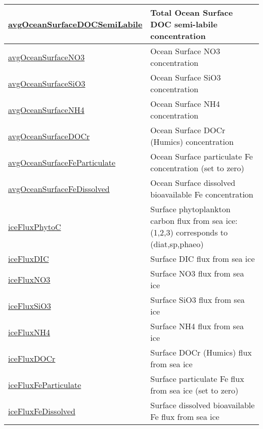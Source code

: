 {\begin{center}
\begin{longtable}{| p{2.0in} | p{4.0in} |}
    \hline
    \hyperref[subsec:var_sec_forcing_avgOceanSurfaceDOCSemiLabile]{avgOceanSurfaceDOCSemiLabile} & Total Ocean Surface DOC semi-labile concentration \\
    \hline
    \hyperref[subsec:var_sec_forcing_avgOceanSurfaceNO3]{avgOceanSurfaceNO3} & Ocean Surface NO3 concentration \\
    \hline
    \hyperref[subsec:var_sec_forcing_avgOceanSurfaceSiO3]{avgOceanSurfaceSiO3} & Ocean Surface SiO3 concentration \\
    \hline
    \hyperref[subsec:var_sec_forcing_avgOceanSurfaceNH4]{avgOceanSurfaceNH4} & Ocean Surface NH4 concentration \\
    \hline
    \hyperref[subsec:var_sec_forcing_avgOceanSurfaceDOCr]{avgOceanSurfaceDOCr} & Ocean Surface DOCr (Humics) concentration \\
    \hline
    \hyperref[subsec:var_sec_forcing_avgOceanSurfaceFeParticulate]{avgOceanSurfaceFeParticulate} & Ocean Surface particulate Fe concentration (set to zero) \\
    \hline
    \hyperref[subsec:var_sec_forcing_avgOceanSurfaceFeDissolved]{avgOceanSurfaceFeDissolved} & Ocean Surface dissolved bioavailable Fe concentration \\
    \hline
    \hyperref[subsec:var_sec_forcing_iceFluxPhytoC]{iceFluxPhytoC} & Surface phytoplankton carbon flux from sea ice: (1,2,3) corresponds to (diat,sp,phaeo) \\
    \hline
    \hyperref[subsec:var_sec_forcing_iceFluxDIC]{iceFluxDIC} & Surface DIC flux from sea ice \\
    \hline
    \hyperref[subsec:var_sec_forcing_iceFluxNO3]{iceFluxNO3} & Surface NO3 flux from sea ice \\
    \hline
    \hyperref[subsec:var_sec_forcing_iceFluxSiO3]{iceFluxSiO3} & Surface SiO3 flux from sea ice \\
    \hline
    \hyperref[subsec:var_sec_forcing_iceFluxNH4]{iceFluxNH4} & Surface NH4 flux from sea ice \\
    \hline
    \hyperref[subsec:var_sec_forcing_iceFluxDOCr]{iceFluxDOCr} & Surface DOCr (Humics) flux from sea ice \\
    \hline
    \hyperref[subsec:var_sec_forcing_iceFluxFeParticulate]{iceFluxFeParticulate} & Surface particulate Fe flux from sea ice (set to zero) \\
    \hline
    \hyperref[subsec:var_sec_forcing_iceFluxFeDissolved]{iceFluxFeDissolved} & Surface dissolved bioavailable Fe flux from sea ice \\

\end{longtable}
\end{center}}
